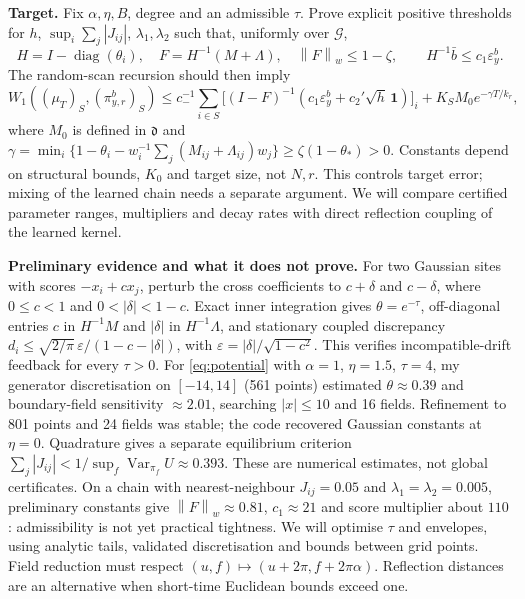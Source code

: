 \documentclass[12pt,a4paper]{article}
\newcommand{\W}{W_1}
\newcommand{\pir}{\pi_{y,r}^{b}}
\newcommand{\epsb}{\varepsilon^{b}_{y}}
\newcommand{\normw}[1]{\left\|#1\right\|_w}
\begin{document}
\textbf{Target.} Fix $\alpha,\eta,B$, degree and an admissible $\tau$. Prove explicit positive thresholds for $h$, $\sup_i\sum_j|J_{ij}|$, $\lambda_1,\lambda_2$ such that, uniformly over $\mathcal G$,
\[
 H=I-\operatorname{diag}(\theta_i),\quad F=H^{-1}(M+\Lambda),\quad
 \normw{F}\leq1-\zeta,\qquad H^{-1}\bar b\leq c_1\epsb.
\]
The random-scan recursion should then imply
\begin{equation}\label{eq:main}
 \W((\mu_T)_S,(\pir)_S)\leq
 c_-^{-1}\sum_{i\in S}\bigl[(I-F)^{-1}(c_1\epsb+c_2'\sqrt h\,\mathbf1)\bigr]_i
 +K_SM_0e^{-\gamma T/k_r},
\end{equation}
where $M_0$ is defined in $\mathfrak d$ and
$\gamma=\min_i\{1-\theta_i-w_i^{-1}\sum_j(M_{ij}+\Lambda_{ij})w_j\}\geq\zeta(1-\theta_*)>0$.
Constants depend on structural bounds, $K_0$ and target size, not $N,r$. This controls target error; mixing of the learned chain needs a separate argument. We will compare certified parameter ranges, multipliers and decay rates with direct reflection coupling of the learned kernel.

\textbf{Preliminary evidence and what it does not prove.} For two Gaussian sites with scores $-x_i+cx_j$, perturb the cross coefficients to $c+\delta$ and $c-\delta$, where $0\leq c<1$ and $0<|\delta|<1-c$. Exact inner integration gives $\theta=e^{-\tau}$, off-diagonal entries $c$ in $H^{-1}M$ and $|\delta|$ in $H^{-1}\Lambda$, and stationary coupled discrepancy $d_i\leq\sqrt{2/\pi}\,\varepsilon/(1-c-|\delta|)$, with $\varepsilon=|\delta|/\sqrt{1-c^2}$. This verifies incompatible-drift feedback for every $\tau>0$.
For \eqref{eq:potential} with $\alpha=1$, $\eta=1.5$, $\tau=4$, my generator discretisation on $[-14,14]$ (561 points) estimated $\theta\approx0.39$ and boundary-field sensitivity $\approx2.01$, searching $|x|\leq10$ and 16 fields. Refinement to 801 points and 24 fields was stable; the code recovered Gaussian constants at $\eta=0$. Quadrature gives a separate equilibrium criterion $\sum_j|J_{ij}|<1/\sup_f\operatorname{Var}_{\pi_f}U\approx0.393$. These are numerical estimates, not global certificates.
On a chain with nearest-neighbour $J_{ij}=0.05$ and $\lambda_1=\lambda_2=0.005$, preliminary constants give $\normw{F}\approx0.81$, $c_1\approx21$ and score multiplier about $110$: admissibility is not yet practical tightness. We will optimise $\tau$ and envelopes, using analytic tails, validated discretisation and bounds between grid points. Field reduction must respect $(u,f)\mapsto(u+2\pi,f+2\pi\alpha)$. Reflection distances are an alternative when short-time Euclidean bounds exceed one.
\end{document}
